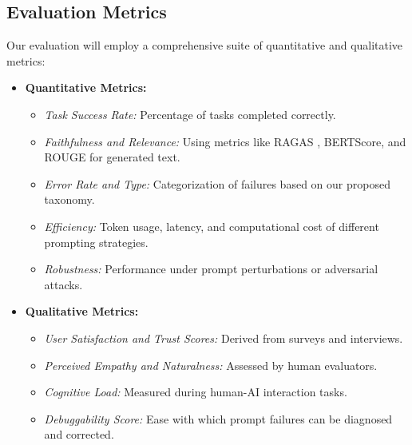 \documentclass{article}
\begin{document}
\subsection{Evaluation Metrics}
Our evaluation will employ a comprehensive suite of quantitative and qualitative metrics:
\begin{itemize}
    \item \textbf{Quantitative Metrics:}
    \begin{itemize}
        \item \textit{Task Success Rate:} Percentage of tasks completed correctly.
        \item \textit{Faithfulness and Relevance:} Using metrics like RAGAS \cite{paper5}, BERTScore, and ROUGE for generated text.
        \item \textit{Error Rate and Type:} Categorization of failures based on our proposed taxonomy.
        \item \textit{Efficiency:} Token usage, latency, and computational cost of different prompting strategies.
        \item \textit{Robustness:} Performance under prompt perturbations or adversarial attacks.
    \end{itemize}
    \item \textbf{Qualitative Metrics:}
    \begin{itemize}
        \item \textit{User Satisfaction and Trust Scores:} Derived from surveys and interviews.
        \item \textit{Perceived Empathy and Naturalness:} Assessed by human evaluators.
        \item \textit{Cognitive Load:} Measured during human-AI interaction tasks.
        \item \textit{Debuggability Score:} Ease with which prompt failures can be diagnosed and corrected.
    \end{itemize}
\end{itemize}
\end{document}
